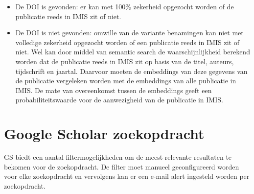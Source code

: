 \begin{itemize}
    \item De DOI is gevonden: er kan met 100\% zekerheid opgezocht worden of de publicatie reeds in IMIS zit of niet.
    \item De DOI is niet gevonden: omwille van de variante benamingen kan niet met volledige zekerheid opgezocht worden of een publicatie reeds in IMIS zit of niet. Wel kan door middel van semantic search de waarschijnlijkheid berekend worden dat de publicatie reeds in IMIS zit op basis van de titel, auteurs, tijdschrift en jaartal. Daarvoor moeten de embeddings van deze gegevens van de publicatie vergeleken worden met de embeddings van alle publicatie in IMIS. De mate van overeenkomst tussen de embeddings geeft een probabiliteitswaarde voor de aanwezigheid van de publicatie in IMIS.
\end{itemize}
\section{Google Scholar zoekopdracht}
GS biedt een aantal filtermogelijkheden om de meest relevante resultaten te bekomen voor de zoekopdracht. De filter moet manueel geconfigureerd worden voor elke zoekopdracht en vervolgens kan er een e-mail alert ingesteld worden per zoekopdracht.

